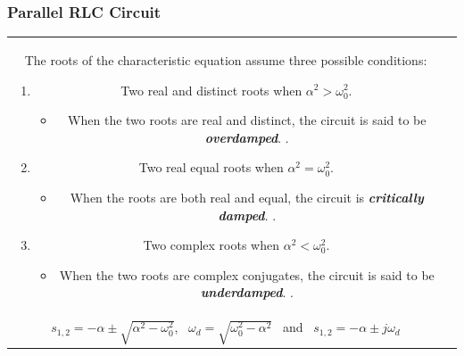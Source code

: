 \documentclass[aspectratio=169]{beamer}
\begin{document}
\begin{frame}[fragile]
	\frametitle{Parallel RLC Circuit}
		\begin{tabular}{cc}
			\begin{columns}
				\begin{column}{1.1\textwidth}  %
The roots of the characteristic equation assume three possible conditions: 


		\begin{enumerate}
						\item{Two real and distinct roots when $\alpha^2>\omega_0^2$.}
						\begin{itemize}
						 \item When the two roots are real and distinct, the circuit is said to be \textbf{\textit{overdamped}}. \newline.
						\end{itemize}						
						\item{Two real equal roots when $\alpha^2=\omega_0^2$.}
						\begin{itemize}
						 \item When the roots are both real and equal, the circuit is \textbf{\textit{critically damped}}. \newline.
						\end{itemize}
						\item{Two complex roots when $\alpha^2<\omega_0^2$.}
						\begin{itemize}
						 \item When the two roots are complex conjugates, the circuit is said to be \textbf{\textit{underdamped}}. \newline.
						\end{itemize}
					\end{enumerate}
					
				\end{column}
			\end{columns}\\
$s_{1,2}=-\alpha \pm \sqrt{\alpha^2-\omega_0^2}$, \ $\omega_d=\sqrt{\omega_0^2-\alpha^2}$ \ and \ $s_{1,2}=-\alpha \pm j\omega_d$		
	\end{tabular}
\end{frame}
\end{document}
